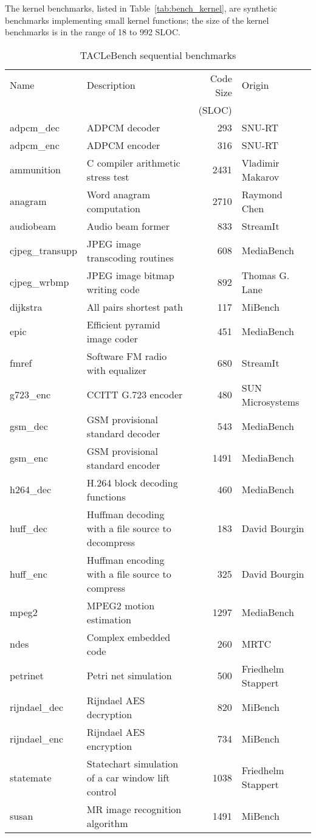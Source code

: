 \documentclass[a4paper,UKenglish]{oasics}
\begin{document}
The kernel benchmarks, listed in Table~\ref{tab:bench_kernel}, are synthetic benchmarks implementing small kernel functions; the size of the kernel benchmarks is in the range of 18 to 992 SLOC.
%
\begin{table}
\centering
\caption{\label{tab:bench_sequential}TACLeBench sequential benchmarks}
\begin{tabular}{lL{5.5cm}rR{2.5cm}}
\toprule
Name & Description & Code Size & Origin\\
   & &  (SLOC) & \\ \midrule
adpcm\_dec & ADPCM decoder & 293 & SNU-RT \\
adpcm\_enc &  ADPCM encoder  & 316  & SNU-RT \\
ammunition & C compiler arithmetic stress test  & 2431 & Vladimir Makarov \\
anagram &  Word anagram computation & 2710  & Raymond Chen \\
audiobeam &  Audio beam former  & 833  & StreamIt \\
cjpeg\_transupp &  JPEG image transcoding routines  & 608 & MediaBench \\
cjpeg\_wrbmp & JPEG image bitmap writing code & 892 & Thomas G. Lane \\
dijkstra & All pairs shortest path  & 117  & MiBench \\
epic & Efficient pyramid image coder  & 451  & MediaBench \\
fmref &  Software FM radio with equalizer & 680  & StreamIt \\
g723\_enc &  CCITT G.723 encoder  & 480  & SUN Microsystems \\
gsm\_dec & GSM provisional standard decoder & 543 & MediaBench \\
gsm\_enc & GSM provisional standard encoder & 1491 & MediaBench \\
h264\_dec &  H.264 block decoding functions & 460 & MediaBench \\
huff\_dec &  Huffman decoding with a file source to decompress  & 183  & David Bourgin \\
huff\_enc & Huffman encoding with a file source to compress  & 325  & David Bourgin \\
mpeg2 &  MPEG2 motion estimation  & 1297 & MediaBench \\
ndes & Complex embedded code  & 260  & MRTC \\
petrinet & Petri net simulation & 500  & Friedhelm Stappert \\
rijndael\_dec & Rijndael AES decryption  & 820 & MiBench \\
rijndael\_enc & Rijndael AES encryption  & 734 & MiBench \\
statemate &  Statechart simulation of a car window lift control & 1038 & Friedhelm Stappert \\
susan &  MR image recognition algorithm & 1491 & MiBench \\
\bottomrule
\end{tabular}
\end{table}
\end{document}
